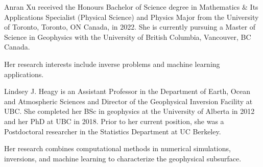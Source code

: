 \documentclass[lettersize,journal]{IEEEtran}
\begin{document}
\vspace{-33pt}

\begin{IEEEbiography}{Anran Xu}
received the Honours Bachelor of Science degree in Mathematics $\&$ Its Applications Specialist (Physical Science) and Physics Major from the University of Toronto, Toronto, ON Canada, in 2022. She is currently pursuing a Master of Science in Geophysics with the University of British Columbia, Vancouver, BC Canada. 
\par
Her research interests include inverse problems and machine learning applications. 
\end{IEEEbiography}
\begin{IEEEbiography}
{Lindsey J. Heagy} is an Assistant Professor in the Department of Earth, Ocean and Atmospheric Sciences and Director of the Geophysical Inversion Facility at UBC. She completed her BSc in geophysics at the University of Alberta in 2012 and her PhD at UBC in 2018. Prior to her current position, she was a Postdoctoral researcher in the Statistics Department at UC Berkeley. 
\par
Her research combines computational methods in numerical simulations, inversions, and machine learning to characterize the geophysical subsurface.

\end{IEEEbiography}

\vfill
\end{document}
